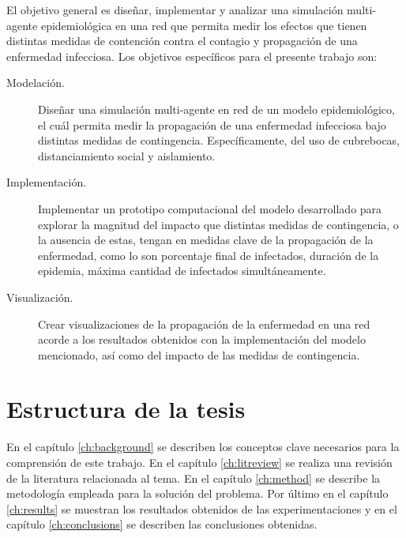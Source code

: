 El objetivo general es diseñar, implementar y analizar una simulación multi-agente epidemiológica en una red que permita medir los efectos que tienen distintas medidas de contención contra el contagio y propagación de una enfermedad infecciosa. Los objetivos específicos para el presente trabajo son:
\begin{description}
\item[Modelación.] Diseñar una simulación multi-agente en red de un modelo epidemiológico, el cuál permita medir la propagación de una enfermedad infecciosa bajo distintas medidas de contingencia. Específicamente, del uso de cubrebocas, distanciamiento social y aislamiento.

\item[Implementación.] Implementar un prototipo computacional del modelo desarrollado para explorar la magnitud del impacto que distintas medidas de contingencia, o la ausencia de estas, tengan en medidas clave de la propagación de la enfermedad, como lo son porcentaje final de infectados, duración de la epidemia, máxima cantidad de infectados simultáneamente.

\item[Visualización.] Crear visualizaciones de la propagación de la enfermedad en una red acorde a los resultados obtenidos con la implementación del modelo mencionado, así como del impacto de las medidas de contingencia. 
\end{description}


\section{Estructura de la tesis}

En el capítulo \ref{ch:background} se describen los conceptos clave necesarios para la comprensión de este trabajo. En el capítulo \ref{ch:litreview} se realiza una revisión de la literatura relacionada al tema. En el capítulo \ref{ch:method} se describe la metodología empleada para la solución del problema. Por último en el capítulo \ref{ch:results} se muestran los resultados obtenidos de las experimentaciones y en el capítulo \ref{ch:conclusions} se describen las conclusiones obtenidas.

